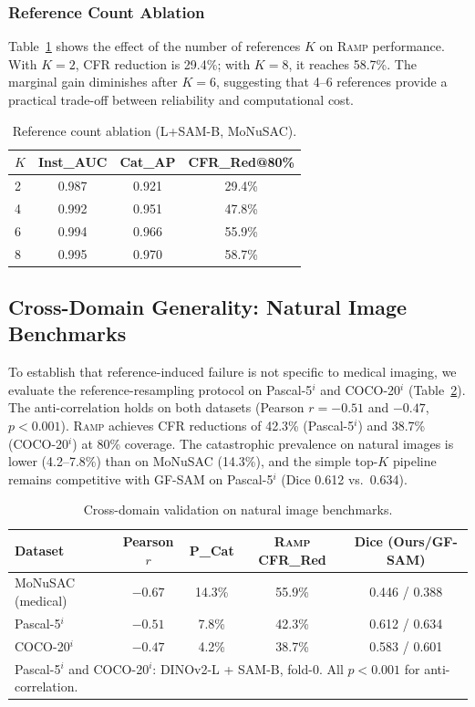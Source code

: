 \documentclass[10pt,twocolumn,letterpaper]{article}
\newcommand{\RAMP}{\textsc{Ramp}}
\begin{document}
\subsubsection{Reference Count Ablation}

Table~\ref{tab:abl_k} shows the effect of the number of references $K$ on
\RAMP{} performance. With $K=2$, CFR reduction is 29.4\%; with $K=8$, it
reaches 58.7\%. The marginal gain diminishes after $K=6$, suggesting that
4--6 references provide a practical trade-off between reliability and
computational cost.

\begin{table}[t]
\centering
\caption{Reference count ablation (L+SAM-B, MoNuSAC).}
\label{tab:abl_k}
\small
\begin{tabular}{lccc}
\toprule
\textbf{$K$} & \textbf{Inst\_AUC} & \textbf{Cat\_AP} & \textbf{CFR\_Red@80\%}\\
\midrule
2 & 0.987 & 0.921 & 29.4\%\\
4 & 0.992 & 0.951 & 47.8\%\\
6 & 0.994 & 0.966 & 55.9\%\\
8 & 0.995 & 0.970 & 58.7\%\\
\bottomrule
\end{tabular}
\end{table}

\subsection{Cross-Domain Generality: Natural Image Benchmarks}

To establish that reference-induced failure is not specific to medical
imaging, we evaluate the reference-resampling protocol on Pascal-5$^i$ and
COCO-20$^i$ (Table~\ref{tab:natural}). The anti-correlation holds on both
datasets (Pearson $r = -0.51$ and $-0.47$, $p<0.001$). \RAMP{} achieves
CFR reductions of 42.3\% (Pascal-5$^i$) and 38.7\% (COCO-20$^i$) at 80\%
coverage. The catastrophic prevalence on natural images is lower (4.2--7.8\%)
than on MoNuSAC (14.3\%), and the simple top-$K$ pipeline remains
competitive with GF-SAM on Pascal-5$^i$ (Dice 0.612 vs.\ 0.634).

\begin{table}[t]
\centering
\caption{Cross-domain validation on natural image benchmarks.}
\label{tab:natural}
\small
\begin{tabular}{lcccc}
\toprule
\textbf{Dataset} & \textbf{Pearson $r$} & \textbf{P\_Cat} & \textbf{\RAMP{} CFR\_Red} & \textbf{Dice (Ours/GF-SAM)}\\
\midrule
MoNuSAC (medical)  & $-0.67$ & 14.3\% & 55.9\% & 0.446 / 0.388\\
Pascal-5$^i$       & $-0.51$ & 7.8\%  & 42.3\% & 0.612 / 0.634\\
COCO-20$^i$        & $-0.47$ & 4.2\%  & 38.7\% & 0.583 / 0.601\\
\bottomrule
\multicolumn{5}{l}{\footnotesize Pascal-5$^i$ and COCO-20$^i$: DINOv2-L + SAM-B, fold-0. All $p<0.001$ for anti-correlation.}
\end{tabular}
\end{table}
\end{document}
